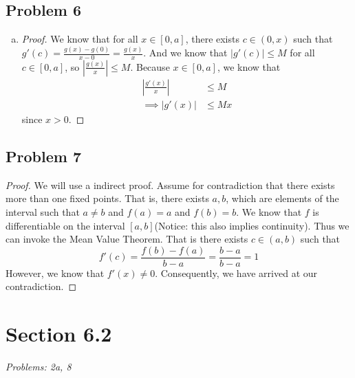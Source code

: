 \documentclass[12pt]{article}
\begin{document}
\subsection*{Problem 6}
\begin{enumerate}[a).]
    \item {
        \begin{proof}
            We know that for all $x \in [0,a]$, there exists $c \in (0,x)$ such that $g'(c) = \frac{g(x) - g(0)}{x-0} = \frac{g(x)}{x}$.
            And we know that $|g'(c)| \le M$ for all $c \in [0,a]$, so $|\frac{g(x)}{x}| \le M$.
            Because $x \in [0,a]$, we know that 
            \begin{align*}
                \left| \frac{g'(x)}{x} \right| &\le M \\
                \implies \left| g'(x)\right| &\le Mx
            \end{align*}
            since $x> 0$.
        \end{proof}
    }
\end{enumerate}

\subsection*{Problem 7}
\begin{proof}
    We will use a indirect proof. 
    Assume for contradiction that there exists more than one fixed points. 
    That is, there exists $a, b$, which are elements of the interval such that $a \ne b$ and $f(a) = a$ and $f(b) = b$. 
    We know that $f$ is differentiable on the interval $[a,b]$(Notice: this also implies continuity).
    Thus we can invoke the Mean Value Theorem.
    That is there exists $c \in (a,b)$ such that 
    $$f'(c) = \frac{f(b) - f(a)}{b - a} = \frac{b - a}{ b - a} = 1$$
    However, we know that $f'(x) \ne 0$.
    Consequently, we have arrived at our contradiction.
\end{proof}


\vspace*{1cm}


\section*{Section 6.2}
\textit{Problems: 2a, 8}
\end{document}
